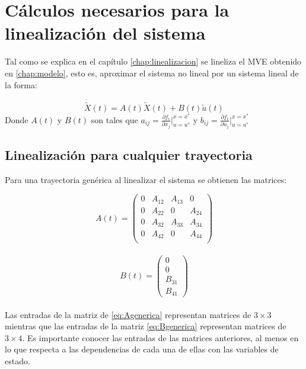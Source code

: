 \documentclass[main]{subfiles}
\begin{document}
\chapter{C\'alculos necesarios para la linealizaci\'on del sistema}
\label{chap:anexo_linealizacion}

Tal como se explica en el cap\'itulo \ref{chap:linealizacion} se lineliza el MVE obtenido en \ref{chap:modelo}, esto es, aproximar el sistema no lineal por un sistema lineal de la forma:

\begin{equation}
\dot{\tilde{X}}(t)=A(t)\tilde{X}(t)+B(t)\tilde{u}(t)
\end{equation}
Donde $A(t)$ y $B(t)$ son tales que $a_{ij}= \frac{\partial f_i}{\partial x_j}\vert_{u=u^*}^{x=x^*}$ y  $b_{ij}= \frac{\partial f_i}{\partial u_j}\vert_{u=u^*}^{x=x^*}$

\section{Linealizaci\'on para cualquier trayectoria}

Para una trayectoria gen\'erica al linealizar el sistema se obtienen las matrices:

\begin{equation}
\label{eq:Agenerica}
A(t)=\left(\begin{array}{cccc}
0 & A_{12} & A_{13} & 0 \\
0 & A_{22} & 0      & A_{24}\\
0 & A_{32} & A_{33} & A_{34}\\
0 & A_{42}     & 0      & A_{44} \\    
\end{array}\right)
\end{equation}\\


\begin{equation}
\label{eq:Bgenerica}
B(t)=\left(\begin{array}{c}
0\\
0\\
B_{31}\\
B_{41} 
\end{array}\right)
\end{equation}\\
Las entradas de la matriz de \ref{eq:Agenerica} representan matrices de $3\times3$ mientras que las entradas de la matriz \ref{eq:Bgenerica} representan matrices de $3\times4$. Es importante conocer las entradas de las matrices anteriores, al menos en lo que respecta a las dependencias de cada una de ellas con las variables de estado. 
\end{document}

